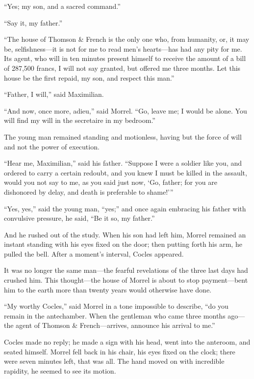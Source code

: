 “Yes; my son, and a sacred command.”

“Say it, my father.”

“The house of Thomson \& French is the only one who, from humanity, or,
it may be, selfishness—it is not for me to read men’s hearts—has had
any pity for me. Its agent, who will in ten minutes present himself to
receive the amount of a bill of 287,500 francs, I will not say granted,
but offered me three months. Let this house be the first repaid, my
son, and respect this man.”

“Father, I will,” said Maximilian.

“And now, once more, adieu,” said Morrel. “Go, leave me; I would be
alone. You will find my will in the secretaire in my bedroom.”

The young man remained standing and motionless, having but the force of
will and not the power of execution.

“Hear me, Maximilian,” said his father. “Suppose I were a soldier like
you, and ordered to carry a certain redoubt, and you knew I must be
killed in the assault, would you not say to me, as you said just now,
‘Go, father; for you are dishonored by delay, and death is preferable
to shame!’”

“Yes, yes,” said the young man, “yes;” and once again embracing his
father with convulsive pressure, he said, “Be it so, my father.”

And he rushed out of the study. When his son had left him, Morrel
remained an instant standing with his eyes fixed on the door; then
putting forth his arm, he pulled the bell. After a moment’s interval,
Cocles appeared.

It was no longer the same man—the fearful revelations of the three last
days had crushed him. This thought—the house of Morrel is about to stop
payment—bent him to the earth more than twenty years would otherwise
have done.

“My worthy Cocles,” said Morrel in a tone impossible to describe, “do
you remain in the antechamber. When the gentleman who came three months
ago—the agent of Thomson \& French—arrives, announce his arrival to me.”

Cocles made no reply; he made a sign with his head, went into the
anteroom, and seated himself. Morrel fell back in his chair, his eyes
fixed on the clock; there were seven minutes left, that was all. The
hand moved on with incredible rapidity, he seemed to see its motion.


